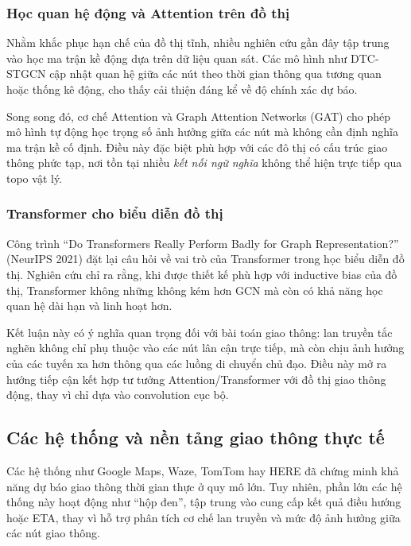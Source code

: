 \subsubsection{Học quan hệ động và Attention trên đồ thị}

Nhằm khắc phục hạn chế của đồ thị tĩnh, nhiều nghiên cứu gần đây tập trung vào học ma trận kề động dựa trên dữ liệu quan sát. Các mô hình như DTC-STGCN cập nhật quan hệ giữa các nút theo thời gian thông qua tương quan hoặc thống kê động, cho thấy cải thiện đáng kể về độ chính xác dự báo.

Song song đó, cơ chế Attention và Graph Attention Networks (GAT) cho phép mô hình tự động học trọng số ảnh hưởng giữa các nút mà không cần định nghĩa ma trận kề cố định. Điều này đặc biệt phù hợp với các đô thị có cấu trúc giao thông phức tạp, nơi tồn tại nhiều \emph{kết nối ngữ nghĩa} không thể hiện trực tiếp qua topo vật lý.

\subsubsection{Transformer cho biểu diễn đồ thị}

Công trình ``Do Transformers Really Perform Badly for Graph Representation?'' (NeurIPS 2021) đặt lại câu hỏi về vai trò của Transformer trong học biểu diễn đồ thị. Nghiên cứu chỉ ra rằng, khi được thiết kế phù hợp với inductive bias của đồ thị, Transformer không những không kém hơn GCN mà còn có khả năng học quan hệ dài hạn và linh hoạt hơn.

Kết luận này có ý nghĩa quan trọng đối với bài toán giao thông: lan truyền tắc nghẽn không chỉ phụ thuộc vào các nút lân cận trực tiếp, mà còn chịu ảnh hưởng của các tuyến xa hơn thông qua các luồng di chuyển chủ đạo. Điều này mở ra hướng tiếp cận kết hợp tư tưởng Attention/Transformer với đồ thị giao thông động, thay vì chỉ dựa vào convolution cục bộ.

\subsection{Các hệ thống và nền tảng giao thông thực tế}

Các hệ thống như Google Maps, Waze, TomTom hay HERE đã chứng minh khả năng dự báo giao thông thời gian thực ở quy mô lớn. Tuy nhiên, phần lớn các hệ thống này hoạt động như ``hộp đen'', tập trung vào cung cấp kết quả điều hướng hoặc ETA, thay vì hỗ trợ phân tích cơ chế lan truyền và mức độ ảnh hưởng giữa các nút giao thông.

